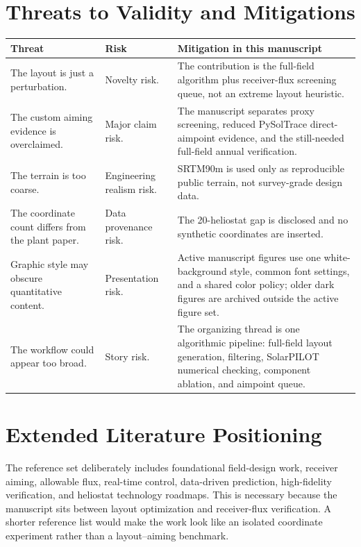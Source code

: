 \documentclass[final,3p,times]{elsarticle}
\begin{document}
\section{Threats to Validity and Mitigations}
\begin{longtable}{p{}p{}p{}}
\toprule
Threat & Risk & Mitigation in this manuscript \\
\midrule
The layout is just a perturbation. & Novelty risk. & The contribution is the full-field algorithm plus receiver-flux screening queue, not an extreme layout heuristic. \\
The custom aiming evidence is overclaimed. & Major claim risk. & The manuscript separates proxy screening, reduced PySolTrace direct-aimpoint evidence, and the still-needed full-field annual verification. \\
The terrain is too coarse. & Engineering realism risk. & SRTM90m is used only as reproducible public terrain, not survey-grade design data. \\
The coordinate count differs from the plant paper. & Data provenance risk. & The 20-heliostat gap is disclosed and no synthetic coordinates are inserted. \\
Graphic style may obscure quantitative content. & Presentation risk. & Active manuscript figures use one white-background style, common font settings, and a shared color policy; older dark figures are archived outside the active figure set. \\
The workflow could appear too broad. & Story risk. & The organizing thread is one algorithmic pipeline: full-field layout generation, filtering, SolarPILOT numerical checking, component ablation, and aimpoint queue. \\
\bottomrule
\end{longtable}

\section{Extended Literature Positioning}
The reference set deliberately includes foundational field-design work, receiver aiming, allowable flux, real-time control, data-driven prediction, high-fidelity verification, and heliostat technology roadmaps. This is necessary because the manuscript sits between layout optimization and receiver-flux verification. A shorter reference list would make the work look like an isolated coordinate experiment rather than a layout--aiming benchmark.
\end{document}
